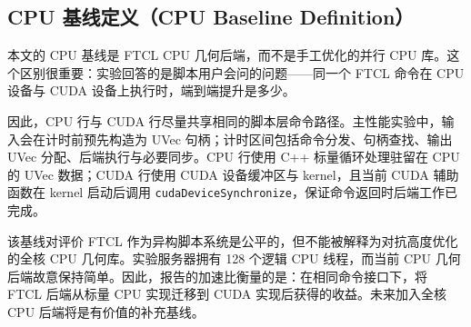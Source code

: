 \subsection{CPU 基线定义（CPU Baseline Definition）}
本文的 CPU 基线是 FTCL CPU 几何后端，而不是手工优化的并行 CPU 库。这个区别很重要：实验回答的是脚本用户会问的问题——同一个 FTCL 命令在 CPU 设备与 CUDA 设备上执行时，端到端提升是多少。

因此，CPU 行与 CUDA 行尽量共享相同的脚本层命令路径。主性能实验中，输入会在计时前预先构造为 UVec 句柄；计时区间包括命令分发、句柄查找、输出 UVec 分配、后端执行与必要同步。CPU 行使用 C++ 标量循环处理驻留在 CPU 的 UVec 数据；CUDA 行使用 CUDA 设备缓冲区与 kernel，且当前 CUDA 辅助函数在 kernel 启动后调用 \texttt{cudaDeviceSynchronize}，保证命令返回时后端工作已完成。

该基线对评价 FTCL 作为异构脚本系统是公平的，但不能被解释为对抗高度优化的全核 CPU 几何库。实验服务器拥有 128 个逻辑 CPU 线程，而当前 CPU 几何后端故意保持简单。因此，报告的加速比衡量的是：在相同命令接口下，将 FTCL 后端从标量 CPU 实现迁移到 CUDA 实现后获得的收益。未来加入全核 CPU 后端将是有价值的补充基线。

